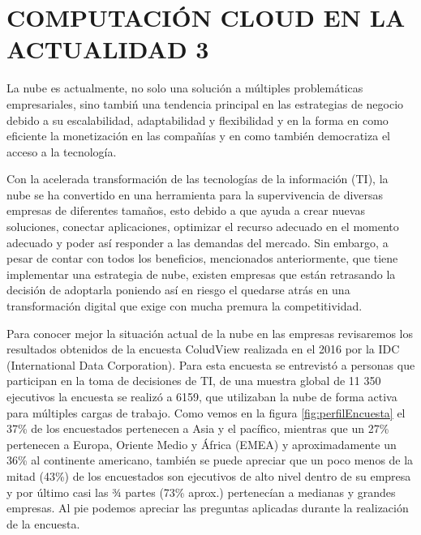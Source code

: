 \documentclass[a4paper, 12pt]{report}
\begin{document}
\chapter{COMPUTACI\'ON CLOUD EN LA ACTUALIDAD 3}
\vspace*{-2em}
\begin{justify}
La nube es actualmente, no solo una soluci\'on a m\'ultiples problem\'aticas empresariales, sino tambi\'n una tendencia principal en las estrategias de negocio debido a su escalabilidad, adaptabilidad y flexibilidad y en la forma en como eficiente la monetizaci\'on en las compa\~n\'ias y en como tambi\'en democratiza el acceso a la tecnolog\'ia.\par

Con la acelerada transformaci\'on de las tecnolog\'ias de la informaci\'on (TI), la nube se ha convertido en una herramienta para la supervivencia de diversas empresas de diferentes tama\~nos, esto debido a que ayuda a crear nuevas soluciones, conectar aplicaciones, optimizar el recurso adecuado en el momento adecuado y poder as\'i responder a las demandas del mercado.
Sin embargo, a pesar de contar con todos los beneficios, mencionados anteriormente, que tiene implementar una estrategia de nube, existen empresas que están retrasando la decisión de adoptarla poniendo as\'i en riesgo el quedarse atr\'as en una transformaci\'on digital que exige con mucha premura la competitividad.\par

Para conocer mejor la situaci\'on actual de la nube en las empresas revisaremos los resultados obtenidos de la encuesta ColudView realizada en el 2016 por la IDC (International Data Corporation). Para esta encuesta se entrevist\'o a personas que participan en la toma de decisiones de TI, de una muestra global de 11 350 ejecutivos la encuesta se realiz\'o a 6159, que utilizaban la nube de forma activa para m\'ultiples cargas de trabajo. Como vemos en la figura \ref{fig:perfilEncuesta} el 37\% de los encuestados pertenecen a Asia y el pac\'ifico, mientras que un 27\% pertenecen a Europa, Oriente Medio y \'Africa (EMEA) y aproximadamente un 36\% al continente americano, tambi\'en se puede apreciar que un poco menos de la mitad (43\%) de los encuestados son ejecutivos de alto nivel dentro de su empresa y por \'ultimo casi las ¾ partes (73\% aprox.) pertenec\'ian a medianas y grandes empresas. Al pie podemos apreciar las preguntas aplicadas durante la realizaci\'on de la encuesta.\par


\end{justify}
\end{document}

